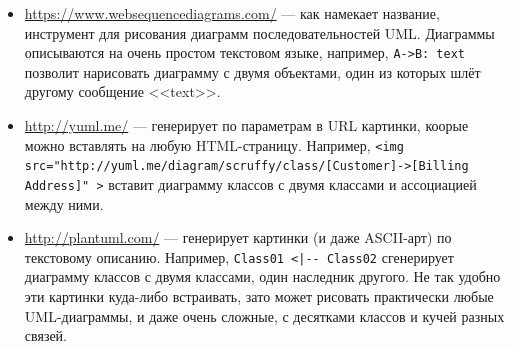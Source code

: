 \documentclass[a5paper]{article}
\begin{document}
\begin{itemize}
    \begin{itemize}
        \item \url{https://www.websequencediagrams.com/} --- как намекает название, инструмент для рисования диаграмм последовательностей UML. Диаграммы описываются на очень простом текстовом языке, например, \verb|A->B: text| позволит нарисовать диаграмму с двумя объектами, один из которых шлёт другому сообщение <<text>>.
        \item \url{http://yuml.me/} --- генерирует по параметрам в URL картинки, коорые можно вставлять на любую HTML-страницу. Например, \verb|<img src="http://yuml.me/diagram/scruffy/class/[Customer]->[Billing Address]" >| вставит диаграмму классов с двумя классами и ассоциацией между ними.
        \item \url{http://plantuml.com/} --- генерирует картинки (и даже ASCII-арт) по текстовому описанию. Например, \verb&Class01 <|-- Class02& сгенерирует диаграмму классов с двумя классами, один наследник другого. Не так удобно эти картинки куда-либо встраивать, зато может рисовать практически любые UML-диаграммы, и даже очень сложные, с десятками классов и кучей разных связей.
    \end{itemize}
\end{itemize}
\end{document}
